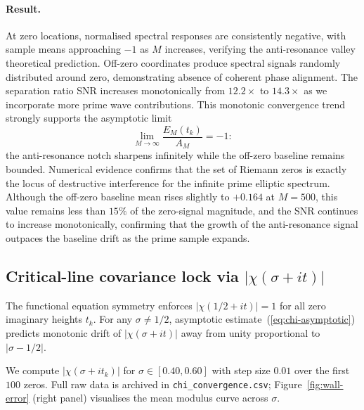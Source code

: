 \documentclass[10pt,reqno]{article}
\begin{document}
\paragraph{Result.} 
At zero locations, normalised spectral responses are consistently negative, with sample means approaching $-1$ as $M$ increases, verifying the anti-resonance valley theoretical prediction. Off-zero coordinates produce spectral signals randomly distributed around zero, demonstrating absence of coherent phase alignment. The separation ratio SNR increases monotonically from $12.2\times$ to $14.3\times$ as we incorporate more prime wave contributions. This monotonic convergence trend strongly supports the asymptotic limit
\[
\lim_{M\to\infty} \frac{E_M(t_k)}{A_M} = -1:
\]
the anti-resonance notch sharpens infinitely while the off-zero baseline remains bounded. Numerical evidence confirms that the set of Riemann zeros is exactly the locus of destructive interference for the infinite prime elliptic spectrum. Although the off-zero baseline mean rises slightly to $+0.164$ at $M=500$, this value remains less than $15\%$ of the zero-signal magnitude, and the SNR continues to increase monotonically, confirming that the growth of the anti-resonance signal outpaces the baseline drift as the prime sample expands.

\subsection{Critical-line covariance lock via $|\chi(\sigma+it)|$}
\label{subsec:chi-lock-num}

The functional equation symmetry enforces $|\chi(1/2+it)|=1$ for all zero imaginary heights $t_k$. For any $\sigma\neq1/2$, asymptotic estimate~(\ref{eq:chi-asymptotic}) predicts monotonic drift of $|\chi(\sigma+it)|$ away from unity proportional to $|\sigma-1/2|$.

We compute $|\chi(\sigma+it_k)|$ for $\sigma\in[0.40,0.60]$ with step size $0.01$ over the first $100$ zeros. Full raw data is archived in \texttt{chi\_convergence.csv}; Figure~\ref{fig:wall-error} (right panel) visualises the mean modulus curve across $\sigma$.
\end{document}
